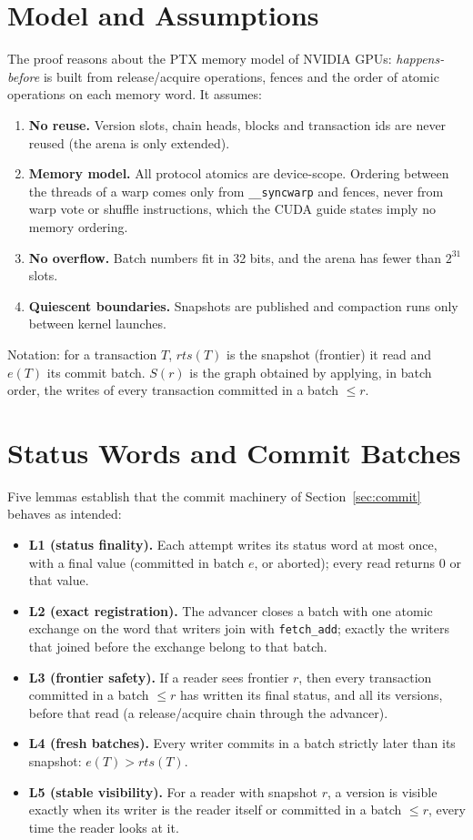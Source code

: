 \documentclass[11pt,a4paper,oneside]{report}
\newcommand{\code}[1]{\texttt{#1}}
\begin{document}
\section{Model and Assumptions}
\label{sec:proof-model}
The proof reasons about the PTX memory model of NVIDIA GPUs: \emph{happens-before} is built from release/acquire
operations, fences and the order of atomic operations on each memory word. It assumes:
\begin{enumerate}[label=\textbf{A\arabic*}]
\item \textbf{No reuse.} Version slots, chain heads, blocks and transaction ids are never reused (the arena is only
  extended).
\item \textbf{Memory model.} All protocol atomics are device-scope. Ordering between the threads of a warp comes only
  from \code{\_\_syncwarp} and fences, never from warp vote or shuffle instructions, which the CUDA guide states imply
  no memory ordering.
\item \textbf{No overflow.} Batch numbers fit in 32 bits, and the arena has fewer than $2^{31}$ slots.
\item \textbf{Quiescent boundaries.} Snapshots are published and compaction runs only between kernel launches.
\end{enumerate}
Notation: for a transaction $T$, $rts(T)$ is the snapshot (frontier) it read and $e(T)$ its commit batch. $S(r)$ is
the graph obtained by applying, in batch order, the writes of every transaction committed in a batch $\le r$.

\section{Status Words and Commit Batches}
Five lemmas establish that the commit machinery of Section~\ref{sec:commit} behaves as intended:
\begin{itemize}
\item \textbf{L1 (status finality).} Each attempt writes its status word at most once, with a final value
  (committed in batch $e$, or aborted); every read returns 0 or that value.
\item \textbf{L2 (exact registration).} The advancer closes a batch with one atomic exchange on the word that writers
  join with \code{fetch\_add}; exactly the writers that joined before the exchange belong to that batch.
\item \textbf{L3 (frontier safety).} If a reader sees frontier $r$, then every transaction committed in a batch $\le r$
  has written its final status, and all its versions, before that read (a release/acquire chain through the advancer).
\item \textbf{L4 (fresh batches).} Every writer commits in a batch strictly later than its snapshot: $e(T) > rts(T)$.
\item \textbf{L5 (stable visibility).} For a reader with snapshot $r$, a version is visible exactly when its writer is
  the reader itself or committed in a batch $\le r$, every time the reader looks at it.
\end{itemize}
\end{document}

